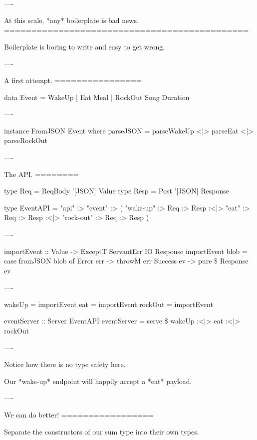 ----

At this scale, *any* boilerplate is bad news.
=============================================

Boilerplate is boring to write and easy to get wrong.

----

A first attempt.
================

\begin{hs}
  data Event = WakeUp
             | Eat     Meal
             | RockOut Song Duration
\end{hs}

----

\begin{hs}
  instance FromJSON Event where
    parseJSON = parseWakeUp
            <|> parseEat
            <|> parseRockOut
\end{hs}

----

The API.
========

\begin{hs}
  type Req  = ReqBody '[JSON] Value
  type Resp = Post    '[JSON] Response

  type EventAPI =
    "api" :> "event" :>
               ( "wake-up"  :> Req :> Resp
            :<|> "eat"      :> Req :> Resp
            :<|> "rock-out" :> Req :> Resp
               )
\end{hs}

----

\begin{hs}
  importEvent :: Value -> ExceptT ServantErr IO Response
  importEvent blob =
    case fromJSON blob of
      Error   err -> throwM err
      Success ev  -> pure \$ Response ev
\end{hs}

----

\begin{hs}
  wakeUp  = importEvent
  eat     = importEvent
  rockOut = importEvent

  eventServer :: Server EventAPI
  eventServer = serve \$
    wakeUp :<|> eat :<|> rockOut
\end{hs}

----

Notice how there is no type safety here.

Our *wake-up* endpoint will happily accept a *eat* payload.

----

We can do better!
=================

Separate the constructors of our sum type into their own types.

